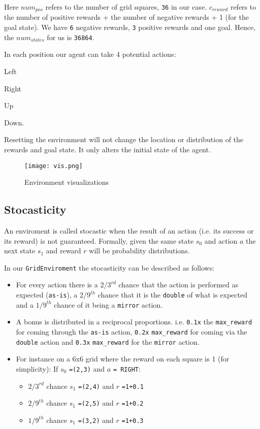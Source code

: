 \documentclass{article} %
\begin{document}
Here $num_{pos}$ refers to the number of grid squares, \verb|36| in our case. $c_{reward}$
refers to the number of positive rewards + the number of negative rewards + 1 (for the goal
state). We have \verb|6| negative rewards, \verb|3| positive rewards and one goal. Hence, 
the $num_{states}$ for us is \verb|36864|.

In each position our agent can take 4 potential actions:
\begin{enumerate*}
    \item Left
    \item Right
    \item Up
    \item Down.
\end{enumerate*}
Resetting the environment will not change the location or distribution of the rewards and
goal state. It only alters the initial state of the agent.

\begin{figure}[h]
    \begin{center}
        \texttt{[image: vis.png]}
    \end{center}
    \caption{Environment visualizations}
\end{figure}



\subsection{Stocasticity}
An enviroment is called stocastic when the result of an action (i.e. its success or its 
reward) is not guaranteed. Formally, given the same state $s_0$ and action $a$ the next state
$s_1$ and reward $r$ will be probability distributions.

In our \verb|GridEnviroment| the stocasticity can be described as follows:
\begin{itemize}
    \item For every action there is a $2/3^{rd}$ chance that the action is performed as
        expected (\verb|as-is|), a $2/9^{th}$ chance that it is the \verb|double| of what 
        is expected and a $1/9^{th}$ chance of it being a \verb|mirror| action.
    \item A bonus is distributed in a reciprocal proportions. i.e. \verb|0.1x| the
        \verb|max_reward| for coming through the \verb|as-is| action, \verb|0.2x| \verb|max_reward|
        for coming via the \verb|double| action and \verb|0.3x| \verb|max_reward| for the
        \verb|mirror| action.
    \item For instance on a 6x6 grid where the reward on each square is 1 (for simplicity):
    \newline
    If $s_0$ \verb|=(2,3)| and $a$ \verb|= RIGHT|:
        \begin{itemize}
            \item $2/3^{rd}$ chance $s_1$ \verb|=(2,4)| and $r$ \verb|=1+0.1|
            \item $2/9^{th}$ chance $s_1$ \verb|=(2,5)| and $r$ \verb|=1+0.2|
            \item $1/9^{th}$ chance $s_1$ \verb|=(3,2)| and $r$ \verb|=1+0.3|
        \end{itemize}
\end{itemize}
\end{document}
